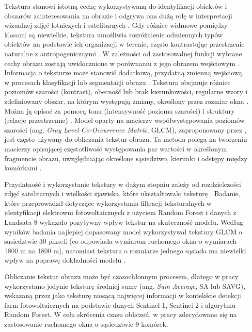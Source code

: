 \documentclass{amuthesis}
\begin{document}
Tekstura stanowi istotną cechę wykorzystywaną do identyfikacji obiektów
i obszarów zainteresowania na obrazie \autocite{haralick_1973_texture} i
odgrywa ona dużą rolę w interpretacji wizualnej zdjęć lotniczych i
satelitarnych \autocite{lewinski_2012_texture}. Gdy różnice widmowe
pomiędzy klasami są niewielkie, tekstura umożliwia rozróżnienie
odmiennych typów obiektów na podstawie ich organizacji w terenie, często
kontrastując przestrzenie naturalne z antropogenicznymi
\autocite{grass_r_texture}. W zależności od zastosowalnej funkcji
wybrane cechy obrazu zostają uwidocznione w porównaniu z jego obrazem
wejściowym \autocite{lewinski_2012_texture}. Informacja o teksturze może
stanowić dodatkową, przydatną zmienną wejściową w procesach klasyfikacji
lub segmentacji obrazu
\autocite{gong_1992_spatial_features,mumby_2002_ikonos}. Tekstura
obejmuje różnice poziomów szarości (kontrast), obecność lub brak
kierunkowości, regularne wzory i zdefiniowany obszar, na którym
występują zmiany, określony przez rozmiar okna
\autocite{hall_beyer_2017_glcm,grass_r_texture}. Można ją opisać za
pomocą tonu (intensywność poziomu szarości) i struktury (relacje
przestrzenne) \autocite{grass_r_texture}. Model oparty na macierzy
współwystępowania poziomów szarości (ang. \emph{Gray Level Co-Occurrence
Matrix}, GLCM), zaproponowany przez \textcite{haralick_1973_texture},
jest często używany do obliczania tekstur obrazu. Ta metoda polega na
tworzeniu macierzy opisującej częstotliwość występowania par wartości w
określonym fragmencie obrazu, uwzględniając określone sąsiedztwo,
kierunki i odstępy między komórkami \autocite{kupidura_2019_texture}.

Przydatność i wykorzystanie tekstury w dużym stopniu zależy od
rozdzielczości zdjęć satelitarnych i wielkości zjawiska, które
ukształtowało teksturę \autocite{grass_r_texture}. Badanie, które
przeprowadził \textcite{zhang_2021_texture} dotyczące wykorzystania
filtracji teksturalnych w identyfikacji elektrowni fotowoltaicznych z
użyciem Random Forest i danych z Landsata-8 wykazało pozytywny wpływ
tekstur na skuteczność modelu. Według wyników badania najlepiej
dopasowany model wykorzystywał tekstury GLCM o sąsiedztwie 30 pikseli
(co odpowiada wymiarom ruchomego okna o wymiarach 1800 m na 1800 m),
natomiast tekstura o rozmiarze jednego sąsiada ma niewielki wpływ na
poprawę dokładności modelu \autocite{zhang_2021_texture}.

Obliczanie tekstur obrazu może być czasochłonnym procesem, dlatego w
pracy wykorzystano jedynie teksturę średniej sumy (ang. \emph{Sum
Average}, SA lub SAVG), wskazaną przez \textcite{wang_2022_pv} jako
teksturę niosącą najwięcej informacji w kontekście detekcji farm
fotowoltaicznych na podstawie danych Sentinel-1, Sentinel-2 i algorytmu
Random Forest. W celu skrócenia czasu obliczeń, w pracy zdecydowano się
na zastosowanie ruchomego okna o sąsiedztwie 9 komórek.
\end{document}
